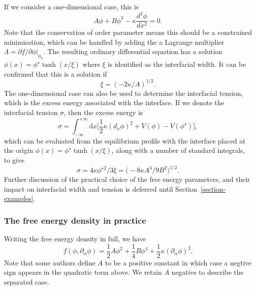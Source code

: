 If we consider a one-dimensional case, this is
\begin{equation}
A\phi + B\phi^3 - \kappa \frac{d^2 \phi}{dx^2} = 0.
\end{equation}
Note that the conservation of order parameter means this should be a
constrained minimisation, which can be handled by adding the
a Lagrange multiplier $\Lambda = \partial f / \partial \phi |_{\phi_0}$.
The resulting ordinary differential equation has a solution
$\phi(x) = \phi^\star \tanh(x/\xi)$ where $\xi$ is identified
as the interfacial width. It can be confirmed that this is a solution
if
\begin{equation}
\xi = (-2\kappa / A)^{1/2}.
\end{equation}
The one-dimensional case can also be used to determine the interfacial
tension, which is the excess energy associated with the interface.
If we denote the interfacial tension $\sigma$, then the excess
energy is
\begin{equation}
\sigma = \int_{-\infty}^{+\infty} \mathrm{d} x
\Big[
{\textstyle \frac{1}{2}} \kappa (d_x \phi)^2 + V(\phi) - V(\phi^\star)
\Big],
\end{equation}
which can be evaluated from the equilibrium profile with the interface
placed at the origin $\phi(x) = \phi^\star\tanh(x/\xi)$, along with a number
of standard integrals, to give
\begin{equation}
\sigma =  4\kappa\phi^{\star 2}/3\xi
 = \big(-8\kappa A^3/9B^2\big)^{1/2}.
\end{equation}
Further discussion of the practical choice of the free energy parameters,
and their
impact on interfacial width and tension is deferred until
Section~\ref{section-examples}.

\subsubsection{The free energy density in practice}

Writing the free energy density in full, we have
\begin{equation}
\label{eq-binary-fed}
f(\phi, \partial_\alpha \phi) =
{\textstyle\frac{1}{2}} A \phi^2 +
{\textstyle\frac{1}{4}} B \phi^4 +
{\textstyle\frac{1}{2}} \kappa (\partial_\alpha \phi)^2.
\end{equation}
Note that some authors define $A$ to be a positive constant in which case
a negtive sign appears in the quadratic term above. We retain $A$ negative
to describe the separated case.


